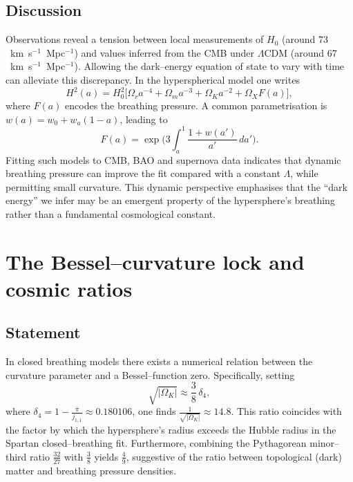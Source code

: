 \documentclass{article}
\begin{document}
\subsection{Discussion}
Observations reveal a tension between local measurements of $H_0$ (around $73$~km~s$^{-1}$~Mpc$^{-1}$) and values inferred from the CMB under $\Lambda$CDM (around $67$~km~s$^{-1}$~Mpc$^{-1}$).  Allowing the dark–energy equation of state to vary with time can alleviate this discrepancy.  In the hyperspherical model one writes
\[
H^2(a) = H_0^2 \Big[\Omega_r a^{-4} + \Omega_m a^{-3} + \Omega_K a^{-2} + \Omega_X F(a) \Big],
\]
where $F(a)$ encodes the breathing pressure.  A common parametrisation is $w(a)=w_0+w_a(1-a)$, leading to
\[
F(a)=\exp\Big( 3 \int_a^1 \! \frac{1+w(a')}{a'}\,da'\Big).
\]
Fitting such models to CMB, BAO and supernova data indicates that dynamic breathing pressure can improve the fit compared with a constant $\Lambda$, while permitting small curvature.  This dynamic perspective emphasises that the ``dark energy'' we infer may be an emergent property of the hypersphere’s breathing rather than a fundamental cosmological constant.

\section{The Bessel–curvature lock and cosmic ratios}
\label{sec:bessel}
\subsection{Statement}
In closed breathing models there exists a numerical relation between the curvature parameter and a Bessel–function zero.  Specifically, setting
\[
\sqrt{|\Omega_K|} \approx \frac{3}{8}\,\delta_4,
\]
where $\delta_4 = 1 - \frac{\pi}{j_{1,1}} \approx 0.180106$, one finds $\frac{1}{\sqrt{|\Omega_K|}} \approx 14.8$.  This ratio coincides with the factor by which the hypersphere’s radius exceeds the Hubble radius in the Spartan closed–breathing fit.  Furthermore, combining the Pythagorean minor–third ratio $\frac{32}{27}$ with $\frac{3}{8}$ yields $\frac{4}{9}$, suggestive of the ratio between topological (dark) matter and breathing pressure densities.
\end{document}

